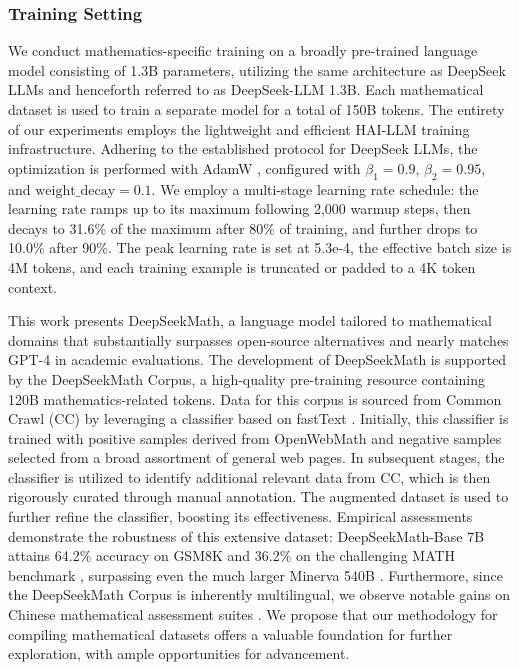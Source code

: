 \subsubsection{Training Setting}
\label{sec:quality-policy}
We conduct mathematics-specific training on a broadly pre-trained language model consisting of 1.3B parameters, utilizing the same architecture as DeepSeek LLMs \citep{deepseek-llm} and henceforth referred to as DeepSeek-LLM 1.3B. Each mathematical dataset is used to train a separate model for a total of 150B tokens. The entirety of our experiments employs the lightweight and efficient HAI-LLM \citep{haillm} training infrastructure. Adhering to the established protocol for DeepSeek LLMs, the optimization is performed with AdamW \citep{adamW}, configured with $\beta_1=0.9$, $\beta_2=0.95$, and $\mathrm{weight\_decay}=0.1$. We employ a multi-stage learning rate schedule: the learning rate ramps up to its maximum following 2,000 warmup steps, then decays to 31.6\% of the maximum after 80\% of training, and further drops to 10.0\% after 90\%. The peak learning rate is set at 5.3e-4, the effective batch size is 4M tokens, and each training example is truncated or padded to a 4K token context.

This work presents DeepSeekMath, a language model tailored to mathematical domains that substantially surpasses open-source alternatives and nearly matches GPT-4 in academic evaluations. The development of DeepSeekMath is supported by the DeepSeekMath Corpus, a high-quality pre-training resource containing 120B mathematics-related tokens. Data for this corpus is sourced from Common Crawl (CC) by leveraging a classifier based on fastText \citep{joulin2016fasttext}. Initially, this classifier is trained with positive samples derived from OpenWebMath \citep{openwebmath} and negative samples selected from a broad assortment of general web pages. In subsequent stages, the classifier is utilized to identify additional relevant data from CC, which is then rigorously curated through manual annotation. The augmented dataset is used to further refine the classifier, boosting its effectiveness. Empirical assessments demonstrate the robustness of this extensive dataset: DeepSeekMath-Base 7B attains 64.2\% accuracy on GSM8K \citep{gsm8k} and 36.2\% on the challenging MATH benchmark \citep{MATH}, surpassing even the much larger Minerva 540B \citep{minerva}. Furthermore, since the DeepSeekMath Corpus is inherently multilingual, we observe notable gains on Chinese mathematical assessment suites \citep{wei2023cmath,agieval}. We propose that our methodology for compiling mathematical datasets offers a valuable foundation for further exploration, with ample opportunities for advancement.

